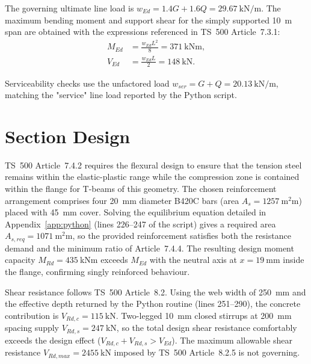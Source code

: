 \documentclass[12pt,a4paper]{report}
\newenvironment{calculation}{\begin{equation}\begin{aligned}}{\end{aligned}\end{equation}}
\begin{document}
The governing ultimate line load is $w_{Ed} = 1.4G + 1.6Q = \SI{29.67}{\kilo\newton\per\meter}$. The maximum bending moment and support shear for the simply supported \SI{10}{\meter} span are obtained with the expressions referenced in TS~500 Article~7.3.1:
\begin{calculation}
M_{Ed} &= \frac{w_{Ed} L^2}{8} = \SI{371}{\kilo\newton\meter},\\
V_{Ed} &= \frac{w_{Ed} L}{2} = \SI{148}{\kilo\newton}.
\end{calculation}

Serviceability checks use the unfactored load $w_{ser} = G + Q = \SI{20.13}{\kilo\newton\per\meter}$, matching the "service" line load reported by the Python script.

\section{Section Design}
TS~500 Article~7.4.2 requires the flexural design to ensure that the tension steel remains within the elastic-plastic range while the compression zone is contained within the flange for T-beams of this geometry. The chosen reinforcement arrangement comprises four \SI{20}{\milli\meter} diameter B420C bars (area $A_s = \SI{1257}{\square\milli\meter}$) placed with \SI{45}{\milli\meter} cover. Solving the equilibrium equation detailed in Appendix~\ref{app:python} (lines 226--247 of the script) gives a required area $A_{s,req} = \SI{1071}{\square\milli\meter}$, so the provided reinforcement satisfies both the resistance demand and the minimum ratio of Article~7.4.4. The resulting design moment capacity $M_{Rd} = \SI{435}{\kilo\newton\meter}$ exceeds $M_{Ed}$ with the neutral axis at $x = \SI{19}{\milli\meter}$ inside the flange, confirming singly reinforced behaviour.

Shear resistance follows TS~500 Article~8.2. Using the web width of \SI{250}{\milli\meter} and the effective depth returned by the Python routine (lines 251--290), the concrete contribution is $V_{Rd,c} = \SI{115}{\kilo\newton}$. Two-legged \SI{10}{\milli\meter} closed stirrups at \SI{200}{\milli\meter} spacing supply $V_{Rd,s} = \SI{247}{\kilo\newton}$, so the total design shear resistance comfortably exceeds the design effect ($V_{Rd,c} + V_{Rd,s} > V_{Ed}$). The maximum allowable shear resistance $V_{Rd,max} = \SI{2455}{\kilo\newton}$ imposed by TS~500 Article~8.2.5 is not governing.
\end{document}
